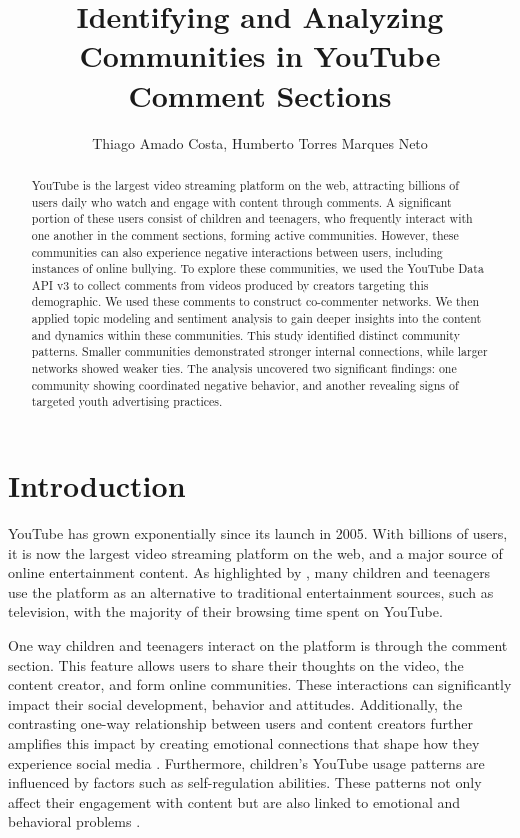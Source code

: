 \documentclass[12pt]{article}
\title{Identifying and Analyzing Communities in YouTube Comment Sections}
\author{Thiago Amado Costa\inst{1}, Humberto Torres Marques Neto\inst{1}}
\begin{document}
\maketitle

\begin{abstract}
    YouTube is the largest video streaming platform on the web, attracting billions of users 
    daily who watch and engage with content through comments. 
    A significant portion of these users consist of children and teenagers, who frequently interact 
    with one another in the comment sections, forming active communities. 
    However, these communities can also experience negative interactions between users, 
    including instances of online bullying.
    To explore these communities, we used the YouTube Data API v3 to collect comments 
    from videos produced by creators targeting this demographic. We used these comments to construct 
    co-commenter networks.
    We then applied topic modeling and sentiment analysis to gain deeper insights into the  
    content and dynamics within these communities.
    This study identified distinct community patterns. Smaller communities 
    demonstrated stronger internal connections, while larger networks showed weaker ties. The analysis 
    uncovered two significant findings: one community showing coordinated negative behavior, and 
    another revealing signs of targeted youth advertising practices.
\end{abstract}

\section{Introduction}

YouTube has grown exponentially since its launch in 2005. With billions of users, it is now the 
largest video streaming platform on the web, and a major source of online entertainment content. 
As highlighted by \cite{app13064044}, many children and teenagers use the platform as an alternative to 
traditional entertainment sources, such as television, with the majority of their 
browsing time spent on YouTube. 

One way children and teenagers interact on the platform is through the comment section. 
This feature allows users to share their thoughts on the video, the content creator, and form online 
communities. These interactions can significantly impact their social development, behavior and 
attitudes. Additionally, the contrasting one-way relationship between users and content creators 
further amplifies this impact by creating emotional connections that shape how they experience social
media \cite{lozano2023social}. 
Furthermore, children's YouTube usage patterns are influenced by factors such as self-regulation 
abilities. These patterns not only affect their engagement with content but are also linked to 
emotional and behavioral problems \cite{kim2024temperament} .
\end{document}
